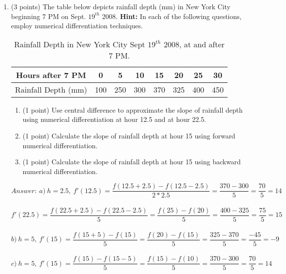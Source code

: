 \documentclass{article}%
\begin{document}
\begin{enumerate}
\item (3 points) The table below depicts rainfall depth (mm) in New York City beginning 7 PM on Sept. $19^{th}$ 2008. \textbf{Hint:} In each of the following questions, employ numerical differentiation techniques.
\vspace{5ex}
\begin{table}[!ht]
    \centering
    \begin{tabular}{c|c|c|c|c|c|c|c}
         \midrule 
         Hours after 7 PM&0&5&10&15&20&25&30\\\hline
         \vspace{0.5ex}Rainfall Depth (mm)&100&250&300&370&325&400&450\\\bottomrule
    \end{tabular}
    \caption{Rainfall Depth in New York City Sept $19^{th}$ 2008, at and after 7 PM.}
    \label{tab:rainfall_table}
\end{table}
\begin{enumerate}
    \item (1 point) Use central difference to approximate the slope of rainfall depth using numerical differentiation at hour 12.5 and at hour 22.5.
    \item (1 point) Calculate the slope of rainfall depth at hour 15 using forward numerical differentiation.
    \item (1 point) Calculate the slope of rainfall depth at hour 15 using backward numerical differentiation.
    \end{enumerate}

    \begin{equation*} Answer: \ a) \ h = 2.5, \ f'(12.5) = \frac{f(12.5 + 2.5) - f(12.5 - 2.5)}{2 * 2.5} = \frac{370 - 300}{5} = \frac{70}{5} = 14
    \end{equation*} \\
    \begin{equation*} f'(22.5) = \frac{f(22.5 + 2.5) - f(22.5 - 2.5)}{5} = \frac{f(25) - f(20)}{5} = \frac{400 - 325}{5} = \frac{75}{5} = 15
    \end{equation*} \\
    \begin{equation*} b) \ h = 5, \ f'(15) = \frac{f(15 + 5) - f(15)}{5} = \frac{f(20) - f(15)}{5} = \frac{325 - 370}{5} = \frac{-45}{5} = -9
    \end{equation*} \\
    \begin{equation*} c) \ h = 5, \ f'(15) = \frac{f(15) - f(15 - 5)}{5} = \frac{f(15) - f(10)}{5} = \frac{370 - 300}{5} = \frac{70}{5} = 14
    \end{equation*}
\end{enumerate}
\end{document}
